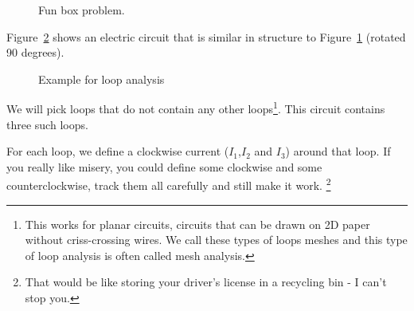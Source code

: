 \begin{figure}[H]
\begin{center}
\caption{Fun box problem.}
\label{F:4RECT}
\end{center}
\end{figure}

Figure~\ref{F:4R} shows an electric circuit that is similar in structure to Figure~\ref{F:4RECT} (rotated 90 degrees).

\begin{figure}[H]
\begin{center}
\caption{Example for loop analysis}
\label{F:4R}
\end{center}
\end{figure}

We will pick loops that do not contain any other loops\footnote{This works for planar circuits, circuits that can be drawn on 2D paper without criss-crossing wires. We call these types of loops meshes and this type of loop analysis is often called mesh analysis.}. This circuit contains three such loops.\par

For each loop, we define a clockwise current ($I_1$,$I_2$ and $I_3$) around that loop. If you really like misery, you could define some clockwise and some counterclockwise, track them all carefully and still make it work. \footnote{That would be like storing your driver's license in a recycling bin - I can't stop you.}

